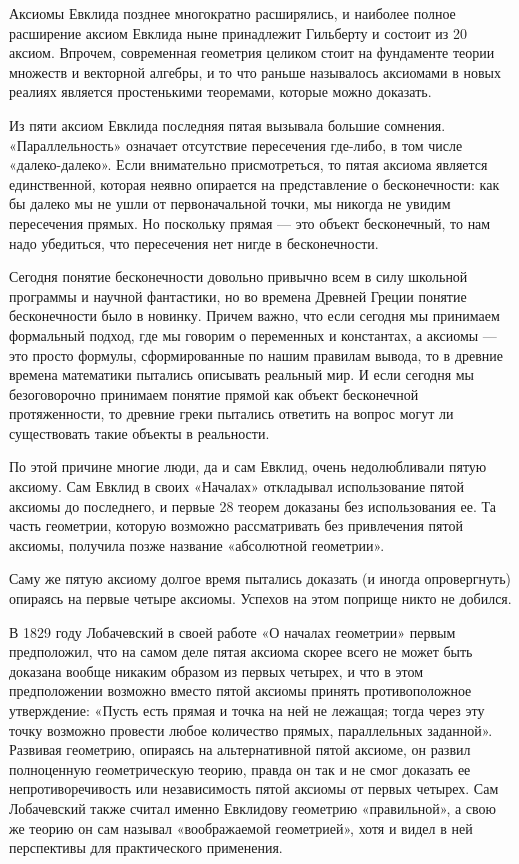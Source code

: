 Аксиомы Евклида позднее многократно расширялись, и наиболее полное расширение аксиом Евклида ныне принадлежит Гильберту и состоит из 20 аксиом. Впрочем, современная геометрия целиком стоит на фундаменте теории множеств и векторной алгебры, и то что раньше называлось аксиомами в новых реалиях является простенькими теоремами, которые можно доказать.

Из пяти аксиом Евклида последняя пятая вызывала большие сомнения. «Параллельность» означает отсутствие пересечения где-либо, в том числе «далеко-далеко». Если внимательно присмотреться, то пятая аксиома является единственной, которая неявно опирается на представление о бесконечности: как бы далеко мы не ушли от первоначальной точки, мы никогда не увидим пересечения прямых. Но поскольку прямая — это объект бесконечный, то нам надо убедиться, что пересечения нет нигде в бесконечности.

Сегодня понятие бесконечности довольно привычно всем в силу школьной программы и научной фантастики, но во времена Древней Греции понятие бесконечности было в новинку. Причем важно, что если сегодня мы принимаем формальный подход, где мы говорим о переменных и константах, а аксиомы — это просто формулы, сформированные по нашим правилам вывода, то в древние времена математики пытались описывать реальный мир. И если сегодня мы безоговорочно принимаем понятие прямой как объект бесконечной протяженности, то древние греки пытались ответить на вопрос могут ли существовать такие объекты в реальности.

По этой причине многие люди, да и сам Евклид, очень недолюбливали пятую аксиому. Сам Евклид в своих «Началах» откладывал использование пятой аксиомы до последнего, и первые 28 теорем доказаны без использования ее. Та часть геометрии, которую возможно рассматривать без привлечения пятой аксиомы, получила позже название «абсолютной геометрии».

Саму же пятую аксиому долгое время пытались доказать (и иногда опровергнуть) опираясь на первые четыре аксиомы. Успехов на этом поприще никто не добился.

В 1829 году Лобачевский в своей работе «О началах геометрии» первым предположил, что на самом деле пятая аксиома скорее всего не может быть доказана вообще никаким образом из первых четырех, и что в этом предположении возможно вместо пятой аксиомы принять противоположное утверждение: «Пусть есть прямая и точка на ней не лежащая; тогда через эту точку возможно провести любое количество прямых, параллельных заданной». Развивая геометрию, опираясь на альтернативной пятой аксиоме, он развил полноценную геометрическую теорию, правда он так и не смог доказать ее непротиворечивость или независимость пятой аксиомы от первых четырех. Сам Лобачевский также считал именно Евклидову геометрию «правильной», а свою же теорию он сам называл «воображаемой геометрией», хотя и видел в ней перспективы для практического применения.

